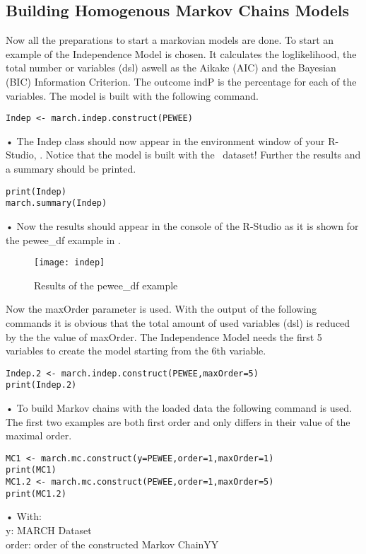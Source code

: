 \subsection{Building Homogenous Markov Chains Models}
Now all the preparations to start a markovian models are done. To start an example of the Independence Model is chosen. It calculates the loglikelihood, the total number or variables (dsl) aswell as the Aikake (AIC) and the Bayesian (BIC) Information Criterion. The outcome indP is the percentage for each of the variables. The model is built with the following command.
\begin{verbatim}
Indep <- march.indep.construct(PEWEE)
\end{verbatim}•
The Indep class should now appear in the environment window of your R-Studio, .
Notice that the model is built with the \M~dataset! Further the results and a summary should be printed.
\begin{verbatim}
print(Indep)
march.summary(Indep)
\end{verbatim}•
Now the results should appear in the console of the R-Studio as it is shown for the pewee\_df example in .
\begin{figure}[h]
    \centering
    \texttt{[image: indep]}
    \caption{Results of the pewee\_df example}
    \label{fig:indep}
\end{figure}
Now the maxOrder parameter is used. With the output of the following commands it is obvious that the total amount of used variables (dsl) is reduced by the the value of maxOrder. The Independence Model needs the first 5 variables to create the model starting from the 6th variable.
\begin{verbatim}
Indep.2 <- march.indep.construct(PEWEE,maxOrder=5)
print(Indep.2)
\end{verbatim}•
To build Markov chains with the loaded data the following command is used. The first two examples are both first order and only differs in their value of the maximal order. 
\begin{verbatim}
MC1 <- march.mc.construct(y=PEWEE,order=1,maxOrder=1)
print(MC1)
MC1.2 <- march.mc.construct(PEWEE,order=1,maxOrder=5)
print(MC1.2)
\end{verbatim}•
With:\\
y: \hspace{37pt}   MARCH Dataset\\
order:\hspace{23pt}   order of the constructed Markov ChainYY\\
